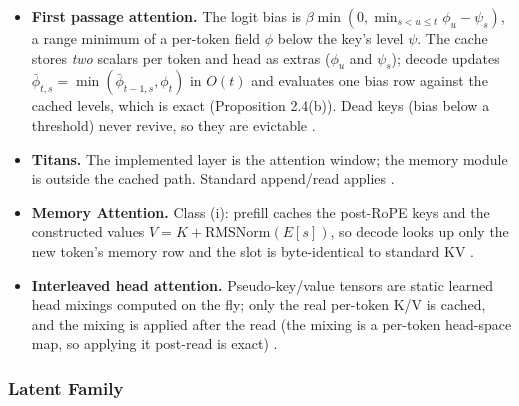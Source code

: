 \begin{itemize}[leftmargin=*]
    \item \textbf{First passage attention.} The logit bias is $\beta\min(0,\min_{s<u\le t}\phi_u-\psi_s)$, a range minimum of a per-token field $\phi$ below the key's level $\psi$. The cache stores \emph{two} scalars per token and head as extras ($\phi_u$ and $\psi_s$); decode updates $\bar{\phi}_{t,s}=\min(\bar{\phi}_{t-1,s},\phi_t)$ in $O(t)$ and evaluates one bias row against the cached levels, which is exact (Proposition 2.4(b)). Dead keys (bias below a threshold) never revive, so they are evictable \citep{liu_first_passage_2026}.
    \item \textbf{Titans.} The implemented layer is the attention window; the memory module is outside the cached path. Standard append/read applies \citep{behrouz_titans_2025}.
    \item \textbf{Memory Attention.} Class (i): prefill caches the post-RoPE keys and the constructed values $V = K + \mathrm{RMSNorm}(E[s])$, so decode looks up only the new token's memory row and the slot is byte-identical to standard KV \citep{kang_memory_attention_2026}.
    \item \textbf{Interleaved head attention.} Pseudo-key/value tensors are static learned head mixings computed on the fly; only the real per-token K/V is cached, and the mixing is applied after the read (the mixing is a per-token head-space map, so applying it post-read is exact) \citep{duvvuri_iha_2026}.
\end{itemize}

\subsubsection{Latent Family}

